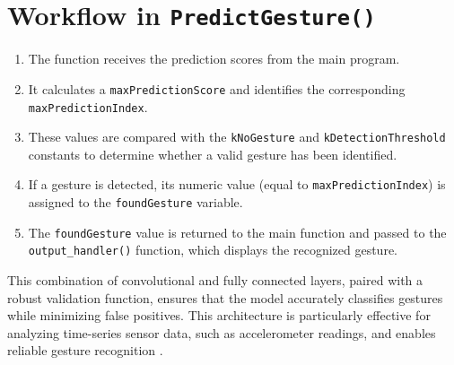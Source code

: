 \section*{Workflow in \texttt{PredictGesture()}}
\begin{enumerate}
	\item The function receives the prediction scores from the main program.
	\item It calculates a \texttt{maxPredictionScore} and identifies the corresponding \texttt{maxPredictionIndex}.
	\item These values are compared with the \texttt{kNoGesture} and \texttt{kDetectionThreshold} constants to determine whether a valid gesture has been identified.
	\item If a gesture is detected, its numeric value (equal to \texttt{maxPredictionIndex}) is assigned to the \texttt{foundGesture} variable.
	\item The \texttt{foundGesture} value is returned to the main function and passed to the \texttt{output\_handler()} function, which displays the recognized gesture.
\end{enumerate}

This combination of convolutional and fully connected layers, paired with a robust validation function, ensures that the model accurately classifies gestures while minimizing false positives. This architecture is particularly effective for analyzing time-series sensor data, such as accelerometer readings, and enables reliable gesture recognition \cite{Warden:2020}.
